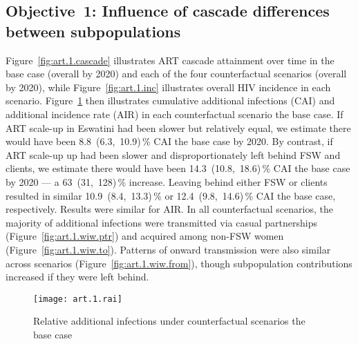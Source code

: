 \subsection{Objective~1: Influence of cascade differences between subpopulations}\label{art.res.1}
Figure~\ref{fig:art.1.cascade} illustrates ART cascade attainment over time
in the base case (\cashi overall by 2020) and
each of the four counterfactual scenarios (\casmd overall by 2020), while
Figure~\ref{fig:art.1.inc} illustrates overall HIV incidence in each scenario.
Figure~\ref{fig:art.1.rai} then illustrates
cumulative additional infections (CAI) and additional incidence rate (AIR)
in each counterfactual scenario \vs the base case.
If ART scale-up in Eswatini had been slower but relatively equal,
we estimate there would have been
8.8~(6.3,~10.9)\,\% CAI \vs the base case by 2020. %
By contrast, if ART scale-up up had been slower and
disproportionately left behind FSW and clients,
we estimate there would have been
14.3~(10.8,~18.6)\,\% CAI \vs the base case by 2020 %
--- a 63~(31,~128)\,\% increase. %
Leaving behind either FSW or clients resulted in similar
10.9~(8.4,~13.3)\,\% or 12.4~(9.8,~14.6)\,\% CAI
\vs the base case, respectively. %
Results were similar for AIR.
In all counterfactual scenarios, the majority of additional infections were
transmitted via casual partnerships (Figure~\ref{fig:art.1.wiw.ptr}) %
and acquired among non-FSW women (Figure~\ref{fig:art.1.wiw.to}). %
Patterns of onward transmission were also similar across scenarios %
(Figure~\ref{fig:art.1.wiw.from}),
though subpopulation contributions increased if they were left behind.
\begin{figure}[h]
  \centering\texttt{[image: art.1.rai]}
  \caption{Relative additional infections under counterfactual scenarios \vs the base case}
  \label{fig:art.1.rai}
\end{figure}
